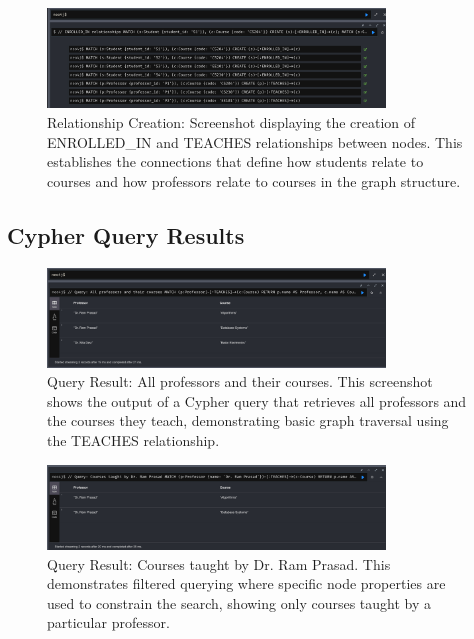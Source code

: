 \begin{figure}[H]
  \centering
  \includegraphics[width=0.8\textwidth]{task-3/screenshots/create-relationships.png}
  \caption{Relationship Creation: Screenshot displaying the creation of ENROLLED\_IN and TEACHES relationships between nodes. This establishes the connections that define how students relate to courses and how professors relate to courses in the graph structure.}
  \label{fig:task3-create-relationships}
\end{figure}

\subsection*{Cypher Query Results}

\begin{figure}[H]
  \centering
  \includegraphics[width=0.8\textwidth]{task-3/screenshots/all-prof-and-their-courses.png}
  \caption{Query Result: All professors and their courses. This screenshot shows the output of a Cypher query that retrieves all professors and the courses they teach, demonstrating basic graph traversal using the TEACHES relationship.}
  \label{fig:task3-all-prof-courses}
\end{figure}

\begin{figure}[H]
  \centering
  \includegraphics[width=0.8\textwidth]{task-3/screenshots/course-by-prof-ram-prasad.png}
  \caption{Query Result: Courses taught by Dr. Ram Prasad. This demonstrates filtered querying where specific node properties are used to constrain the search, showing only courses taught by a particular professor.}
  \label{fig:task3-courses-ram}
\end{figure}

